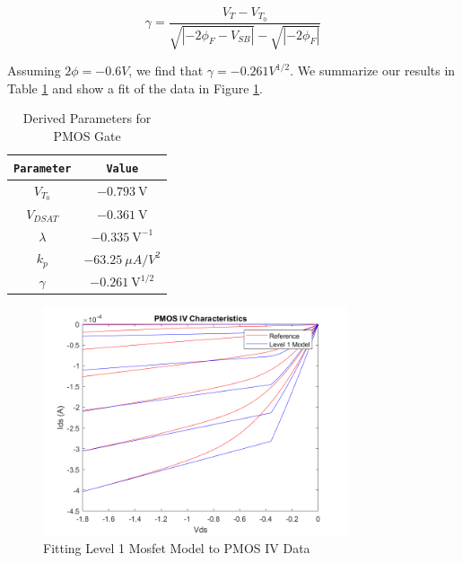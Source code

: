 \documentclass{article}
\begin{document}
	\begin{equation}
		\gamma = \frac{V_T - V_{T_0}}{\sqrt{|-2\phi_F - V_{SB}|} - {\sqrt{|-2\phi_F|}}} 
	\end{equation}
	
	\noindent Assuming $2\phi = -0.6 V$, we find that $\gamma = -0.261 V^{1/2}$. We summarize our results in Table \ref{table::pmos_derived_params} and show a fit of the data in Figure \ref{fig::pmos_iv_fit}.
	
	\begin{table}[H]
	\begin{center}
	\caption{Derived Parameters for PMOS Gate}
	\label{table::pmos_derived_params}
	\begin{tabular}{| c | c |}
		\hline
		\texttt{Parameter} & \texttt{Value}\\
		\hline	
		$V_{T_0}$ & $-0.793\ \text{V}$ \\
		\hline	
		$V_{DSAT}$ & $-0.361\ \text{V}$ \\
		\hline	
		$\lambda$ & $-0.335\ \text{V}^{-1}$\\
		\hline	
		$k_p$ & $-63.25\ {\mu}A/V^2$\\
		\hline	
		$\gamma$ & $-0.261\ \text{V}^{1/2}$\\
		\hline
	\end{tabular}
	\end{center}
	\end{table}
	
	\begin{figure}[H]
		\centerline{\includegraphics[width=0.8\textwidth]{pmos_iv_fit.png}}
		\caption{Fitting Level 1 Mosfet Model to PMOS IV Data}
		\label{fig::pmos_iv_fit}
	\end{figure}
\end{document}
